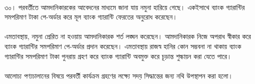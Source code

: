 \documentclass[12pt]{article}
\begin{document}
\\
৩০। পরবর্তীতে আমদানিকারকের আবেদনের মাধ্যমে জানা যায় নমুনা
হারিয়ে গেছে। একইসাথে ব্যাংক গ্যারান্টির সমপরিমাণ টাকা পে-অর্ডার করে
মূল ব্যাংক গ্যারান্টি ফেরতের অনুরোধ করেছেন।
\\
\\
এমতাবস্থায়, নমুনা প্রেরিত না হওয়ায় আমদানিকারক শর্ত লঙ্ঘন করেছেন।
আমদানিকারক নিজে অপরাধ স্বীকার করে ব্যাংক গ্যারান্টির সমপরিমাণ পে-অর্ডার
প্রদান করেছেন। এমতাবস্থায় রাজস্ব হানির কোন সম্ভবনা না থাকায় ব্যাংক
গ্যারান্টির সমপরিমাণ টাকা পুনরায় গ্রহণ করে ব্যাংক গ্যারান্টি অবমুক্ত করে চূড়ান্ত
শুল্কায়ন করা যেতে পারে।
\\
\\
আলোচ্য পণ্যচালানের বিষয়ে পরবর্তী কার্যক্রম গ্রহণের
লক্ষ্যে সদয় সিদ্ধান্তের জন্য নথি উপস্থাপন করা হলো।






\thispagestyle{laststyle}
\end{document}
